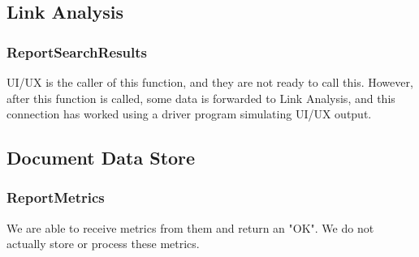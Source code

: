\subsection*{Link Analysis}

\subsubsection*{ReportSearchResults}

UI/UX is the caller of this function, and they are not ready to call this. However, after this function is called, some data is forwarded to Link Analysis, and this connection has worked using a driver program simulating UI/UX output.

\subsection*{Document Data Store}

\subsubsection*{ReportMetrics}

We are able to receive metrics from them and return an "OK". We do not actually store or process these metrics.
